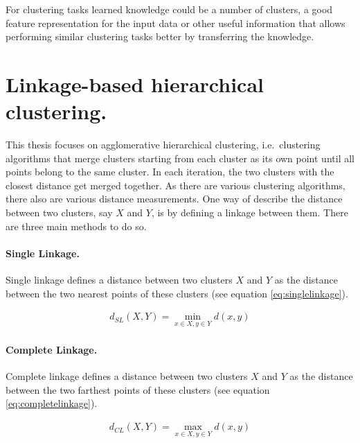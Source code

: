 For clustering tasks learned knowledge could be a number of clusters, a good feature representation for the input data or other useful information that allows performing similar clustering tasks better by transferring the knowledge.

\section{Linkage-based hierarchical clustering.}

This thesis focuses on agglomerative hierarchical clustering, i.e.\ clustering algorithms that merge clusters starting from each cluster as its own point until all points belong to the same cluster. In each iteration, the two clusters with the closest distance get merged together. As there are various clustering algorithms, there also are various distance measurements. One way of describe the distance between two clusters, say $X$ and $Y$, is by defining a linkage between them. There are three main methods to do so.

\paragraph{Single Linkage.}

Single linkage defines a distance between two clusters $X$ and $Y$ as the distance between the two nearest points of these clusters (see equation \ref{eq:singlelinkage}).

\begin{equation}
    \begin{aligned}
        d_{SL}(X,Y) = \min\limits_{x \in X, y \in Y} d(x,y)
    \end{aligned}
    \label{eq:singlelinkage}
\end{equation}

\paragraph{Complete Linkage.}

Complete linkage defines a distance between two clusters $X$ and $Y$ as the distance between the two farthest points of these clusters (see equation \ref{eq:completelinkage}).

\begin{equation}
    \begin{aligned}
        d_{CL}(X,Y) = \max\limits_{x \in X, y \in Y} d(x,y)
    \end{aligned}
    \label{eq:completelinkage}
\end{equation}

